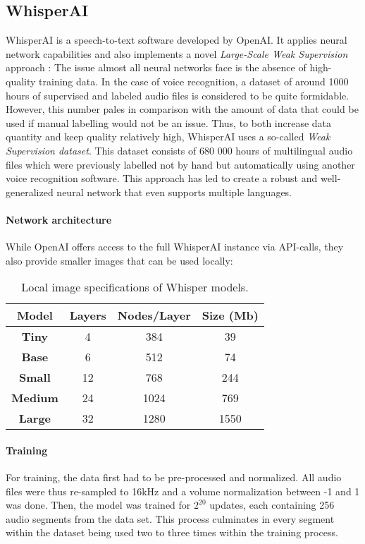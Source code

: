 \documentclass[draft,final]{vutinfth} %
\begin{document}
\subsection{WhisperAI}
WhisperAI is a speech-to-text software developed by OpenAI. It applies neural network capabilities and also implements a novel \emph{Large-Scale Weak Supervision} approach \cite{radford2023robust}: The issue almost all neural networks face is the absence of high-quality training data. In the case of voice recognition, a dataset of around 1000 hours of supervised and labeled audio files is considered to be quite formidable. However, this number pales in comparison with the amount of data that could be used if manual labelling would not be an issue.
Thus, to both increase data quantity and keep quality relatively high, WhisperAI uses a so-called \emph{Weak Supervision dataset}. This dataset consists of 680 000 hours of multilingual audio files which were previously labelled not by hand but automatically using another voice recognition software. This approach has led to create a robust and well-generalized neural network that even supports multiple languages.
\paragraph{Network architecture}
While OpenAI offers access to the full WhisperAI instance via API-calls, they also provide smaller images that can be used locally:
\begin{table}[h]
\begin{center}
\begin{tabular}{|c|c|c|c|}
\hline
 \textbf{Model} &  \textbf{Layers} & \textbf{Nodes/Layer} & \textbf{Size (Mb)} \\ \hline 
\textbf{Tiny} & 4 & 384 & 39 \\ \hline 
\textbf{Base} & 6 & 512 & 74 \\ \hline 
\textbf{Small} & 12 & 768 & 244 \\ \hline 
\textbf{Medium} & 24 & 1024 & 769 \\ \hline 
\textbf{Large} & 32 & 1280 & 1550 \\ \hline 

\end{tabular}
\caption[WhisperAI Models]{Local image specifications of Whisper models.}
\end{center}
\end{table}

\paragraph{Training}
For training, the data first had to be pre-processed and normalized. All audio files were thus re-sampled to 16kHz and a volume normalization between -1 and 1 was done. Then, the model was trained for $2^{20}$ updates, each containing 256 audio segments from the data set. This process culminates in every segment within the dataset being used two to three times within the training process.
\end{document}

